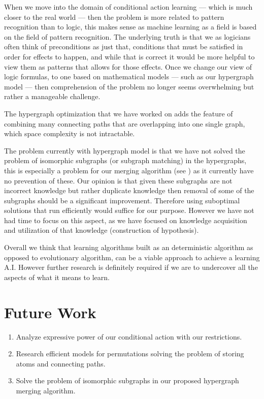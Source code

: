 \documentclass[Master.tex]{subfiles}
\begin{document}
	
	When we move into the domain of conditional action learning --- which is much closer to the real world --- 
	then the problem is more related to pattern recognition than to logic, this makes sense as machine learning as a field is based on the field of pattern recognition. 
	The underlying truth is that we as logicians often think of preconditions as just that, conditions that must be satisfied in order for effects to happen, and while that is correct it would be more helpful to view them as patterns that allows for those effects.
	Once we change our view of logic formulas, to one based on mathematical models --- such as our hypergraph model ---	then comprehension of the problem no longer seems overwhelming but rather a manageable challenge. 
	
	
	The hypergraph optimization that we have worked on adds the feature of combining many connecting paths that are overlapping into one single graph, which space complexity is not intractable.
	
	The problem currently with hypergraph model is that we have not solved the problem of isomorphic subgraphs (or subgraph matching) in the hypergraphs, 
	this is especially a problem for our merging algorithm (see ) as it currently have no prevention of these.
	Our opinion is that given these subgraphs are not incorrect knowledge but rather duplicate knowledge then removal of some of the subgraphs should be a significant improvement.
	Therefore using suboptimal solutions that run efficiently would suffice for our purpose. 
	However we have not had time to focus on this aspect, as we have focused on knowledge acquisition and utilization of that knowledge (construction of hypothesis).
	
	
	Overall we think that learning algorithms built as an deterministic algorithm as opposed to evolutionary algorithm, can be a viable approach to achieve a learning A.I. However further research is definitely required if we are to undercover all the aspects of what it means to learn.
	
	
	
	
	
	

	\section{Future Work}
	
	\begin{enumerate}
		\item Analyze expressive power of our conditional action with our restrictions.
		\item Research efficient models for permutations solving the problem of storing atoms and connecting paths.
		\item Solve the problem of isomorphic subgraphs in our proposed hypergraph merging algorithm.
	\end{enumerate}
	
\end{document}
